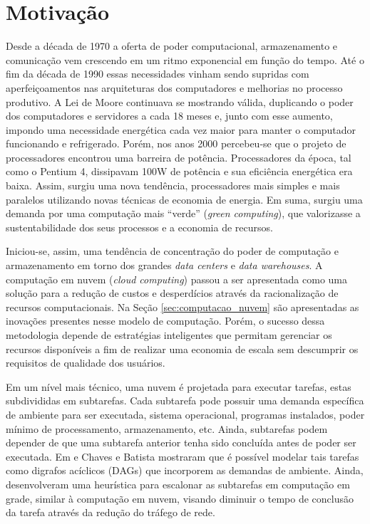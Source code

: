 \section{Motivação}
\label{sec:motivacao}
Desde a década de 1970 a oferta de poder computacional, armazenamento e
comunicação vem crescendo em um ritmo exponencial em função do tempo. Até o fim da
década de 1990 essas necessidades vinham sendo supridas com aperfeiçoamentos nas
arquiteturas dos computadores e melhorias no processo produtivo. A Lei de Moore
continuava se mostrando válida, duplicando o poder dos computadores e servidores
a cada 18 meses e, junto com esse aumento, impondo uma necessidade energética
cada vez maior para manter o computador funcionando e refrigerado. Porém, 
nos anos 2000 percebeu-se que o projeto de processadores encontrou uma
barreira de potência. Processadores da época, tal como o Pentium 4, dissipavam
100W de potência e sua eficiência energética era baixa. \cite{patterson:computer_organization}
Assim, surgiu uma nova tendência, processadores mais simples e mais paralelos
utilizando novas técnicas de economia de energia. Em suma, surgiu uma demanda
por uma computação mais ``verde'' (\emph{green computing}), que valorizasse a
sustentabilidade dos seus processos e a economia de recursos.

Iniciou-se, assim, uma tendência de concentração do poder de computação e 
armazenamento em torno dos grandes \emph{data centers} e \emph{data warehouses}.
A computação em nuvem (\emph{cloud computing}) passou a ser apresentada como
uma solução para a redução de custos e desperdícios através da
racionalização de recursos computacionais. Na Seção \ref{sec:computacao_nuvem}
são apresentadas as inovações presentes nesse modelo de computação. Porém, o 
sucesso dessa metodologia depende de estratégias inteligentes que permitam 
gerenciar os recursos disponíveis a fim de realizar uma economia de escala
sem descumprir os requisitos de qualidade dos usuários.

Em um nível mais técnico, uma nuvem é projetada para executar tarefas, estas
subdivididas em subtarefas. Cada subtarefa pode possuir uma demanda específica
de ambiente para ser executada, sistema operacional, programas instalados, poder
mínimo de processamento, armazenamento, etc. Ainda, subtarefas podem depender de
que uma subtarefa anterior tenha sido concluída antes de poder ser executada. Em
\cite{chaves:scheduling_software_requirements} e 
\cite{batista:embedding_software_requirements} Chaves e Batista mostraram que é 
possível modelar tais tarefas como digrafos acíclicos (DAGs) que incorporem as
demandas de ambiente. Ainda, desenvolveram uma heurística para escalonar as
subtarefas em computação em grade, similar à computação
em nuvem, visando diminuir o tempo de conclusão da tarefa através da redução
do tráfego de rede.


